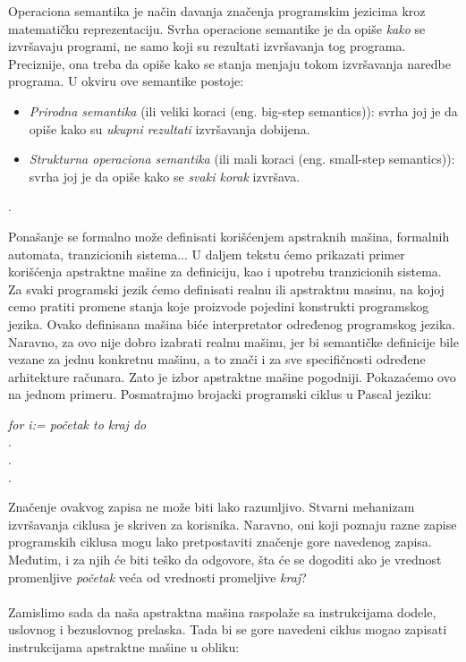 \documentclass[a4paper]{article}
\begin{document}
{\qquad Operaciona semantika je način davanja značenja programskim jezicima kroz matematičku reprezentaciju. Svrha operacione semantike je da opiše \textit{kako} se izvršavaju programi, ne samo koji su rezultati izvršavanja tog programa. Preciznije, ona treba da opiše kako se stanja menjaju tokom izvršavanja  naredbe programa. U okviru ove semantike postoje:
\begin{itemize}
	\item \textit{Prirodna semantika} (ili veliki koraci (eng. big-step semantics)): svrha joj je da opiše kako su \textit{ukupni rezultati} izvršavanja dobijena.
	\item \textit{Strukturna operaciona semantika} (ili mali koraci (eng. small-step semantics)): svrha joj je da opiše kako se \textit{svaki korak} izvršava.
\end{itemize} \cite{wiley}.

Ponašanje se formalno može definisati korišćenjem apstraknih mašina, formalnih automata, tranzicionih sistema... U daljem tekstu ćemo prikazati primer korišćenja apstraktne mašine za definiciju, kao i upotrebu tranzicionih sistema.\\
Za svaki programski jezik ćemo definisati realnu ili apstraktnu masinu, na kojoj cemo pratiti promene stanja koje proizvode pojedini konstrukti programskog jezika. Ovako definisana mašina biće interpretator određenog programskog jezika. Naravno, za ovo nije dobro izabrati realnu mašinu, jer bi semantičke definicije bile vezane za jednu konkretnu mašinu, a to znači i za sve specifičnosti određene arhitekture računara. Zato je izbor apstraktne mašine pogodniji. Pokazaćemo ovo na jednom primeru. Posmatrajmo brojacki programski ciklus u Pascal jeziku:\\

\begin{center}\textit{for i:= početak to kraj do}
\\.
\\.
\\.
\end{center}
\hfill \break
Značenje ovakvog zapisa ne može biti lako razumljivo. Stvarni mehanizam izvršavanja ciklusa je skriven za korisnika. Naravno, oni koji poznaju razne zapise programskih ciklusa mogu lako pretpostaviti značenje gore navedenog zapisa. Međutim, i za njih će biti teško da odgovore, šta će se dogoditi ako je vrednost promenljive \textit{početak} veća od vrednosti promeljive \textit{kraj}?\\
\\Zamislimo sada da naša apstraktna mašina raspolaže sa instrukcijama dodele, uslovnog i bezuslovnog prelaska. Tada bi se gore navedeni ciklus mogao zapisati instrukcijama apstraktne mašine u obliku:\\

}
\end{document}
